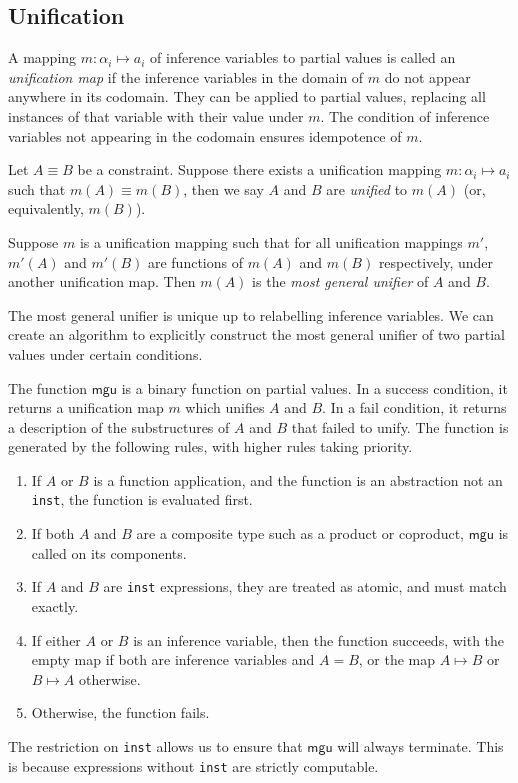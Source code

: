 \documentclass[11pt]{book}
\begin{document}
\subsection{Unification}

\begin{defn}
  A mapping \( m: \alpha_i \mapsto a_i \) of inference variables to partial values is called an \textit{unification map} if the inference variables in the domain of \( m \) do not appear anywhere in its codomain.
  They can be applied to partial values, replacing all instances of that variable with their value under \( m \).
  The condition of inference variables not appearing in the codomain ensures idempotence of \( m \).

  Let \( A \equiv B \) be a constraint.
  Suppose there exists a unification mapping \( m: \alpha_i \mapsto a_i \) such that \( m(A) \equiv m(B) \), then we say \( A \) and \( B \) are \textit{unified} to \( m(A) \) (or, equivalently, \( m(B) \)).

  Suppose \( m \) is a unification mapping such that for all unification mappings \( m' \), \( m'(A) \) and \( m'(B) \) are functions of \( m(A) \) and \( m(B) \) respectively, under another unification map.
  Then \( m(A) \) is the \textit{most general unifier} of \( A \) and \( B \).
\end{defn}
The most general unifier is unique up to relabelling inference variables.
We can create an algorithm to explicitly construct the most general unifier of two partial values under certain conditions.
\begin{defn}
  The function \( \mathsf{mgu} \) is a binary function on partial values.
  In a success condition, it returns a unification map \( m \) which unifies \( A \) and \( B \).
  In a fail condition, it returns a description of the substructures of \( A \) and \( B \) that failed to unify.
  The function is generated by the following rules, with higher rules taking priority.
  \begin{enumerate}
    \item If \( A \) or \( B \) is a function application, and the function is an abstraction not an \lstinline{inst}, the function is evaluated first.
    \item If both \( A \) and \( B \) are a composite type such as a product or coproduct, \( \mathsf{mgu} \) is called on its components.
    \item If \( A \) and \( B \) are \lstinline{inst} expressions, they are treated as atomic, and must match exactly.
    \item If either \( A \) or \( B \) is an inference variable, then the function succeeds, with the empty map if both are inference variables and \( A = B \), or the map \( A \mapsto B \) or \( B \mapsto A \) otherwise.
    \item Otherwise, the function fails.
  \end{enumerate}
  The restriction on \lstinline{inst} allows us to ensure that \( \mathsf{mgu} \) will always terminate.
  This is because expressions without \lstinline{inst} are strictly computable. %
\end{defn}
\end{document}
